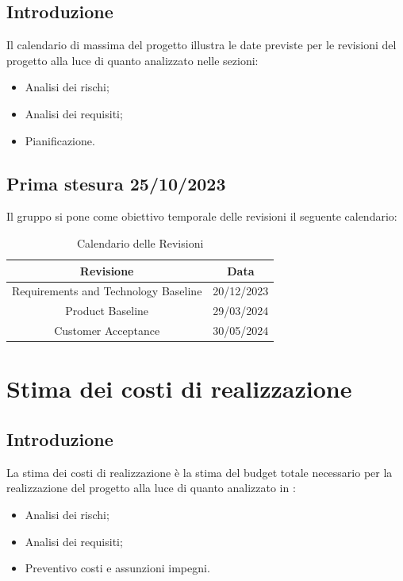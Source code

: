 \documentclass{article}
\begin{document}
\subsection{Introduzione}
Il calendario di massima del progetto illustra le date previste per le revisioni del progetto
alla luce di quanto analizzato nelle sezioni:
\begin{itemize}
    \item Analisi dei rischi;
    \item Analisi dei requisiti;
    \item Pianificazione.
\end{itemize}
\subsection{Prima stesura 25/10/2023}
Il gruppo si pone come obiettivo temporale delle revisioni il seguente calendario:
\begin{table}[ht]
    \centering
    \begin{tabular}{|c|c|}
        \hline
        \textbf{Revisione} & \textbf{Data} \\
        \hline
        Requirements and Technology Baseline & 20/12/2023 \\
        Product Baseline  & 29/03/2024 \\
        Customer Acceptance & 30/05/2024 \\
        \hline
    \end{tabular}
    \caption{Calendario delle Revisioni}
\end{table}
\section{Stima dei costi di realizzazione}
\subsection{Introduzione}
La stima dei costi di realizzazione è la stima del budget totale necessario per la realizzazione del progetto alla luce di quanto analizzato in :
\begin{itemize}
    \item Analisi dei rischi;
    \item Analisi dei requisiti;
    \item Preventivo costi e assunzioni impegni.
\end{itemize}
\end{document}
